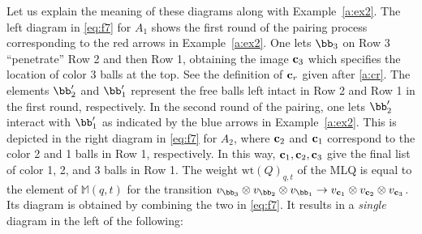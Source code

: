 Let us explain the meaning of these diagrams along with Example~\ref{a:ex2}. 
The left diagram in \eqref{eq:f7} for $A_1$ 
shows the first round of the pairing process corresponding to the red arrows in Example~\ref{a:ex2}. 
One lets $\bb_3$ on Row 3 ``penetrate'' Row 2 and then Row 1, obtaining the image ${\bf c}_3$ 
which specifies the location of color 3 balls at the top. See the definition of ${\bf c}_r$ given after \eqref{a:cr}.
The elements $\bb'_2$ and $\bb'_1$ represent the free balls left intact in Row 2 and Row 1 
in the first round, respectively.
In the second round of the pairing, one lets $\bb'_2$ interact with $\bb'_1$ 
as indicated by the blue arrows in Example~\ref{a:ex2}. 
This is depicted in the right diagram in \eqref{eq:f7} for $A_2$, 
where ${\bf c}_2$ and ${\bf c}_1$ correspond to the color 2 and 1 balls in Row 1, respectively. 
In this way, ${\bf c}_1, {\bf c}_2, {\bf c}_3$ give the final list of color 1, 2, and 3 balls in Row 1. 
The weight $\text{wt}(Q)_{q,t}$ of the MLQ is equal to the element of $\mathbb{M}(q,t)$ for the transition 
$v_{\bb_3} \otimes v_{\bb_2} \otimes v_{\bb_1} 
\rightarrow v_{{\bf c}_1} \otimes v_{{\bf c}_2} \otimes v_{{\bf c}_3}$.
 Its diagram is obtained by combining the two in \eqref{eq:f7}.
 It results in a \textit{single} diagram in the left of the following:
 
